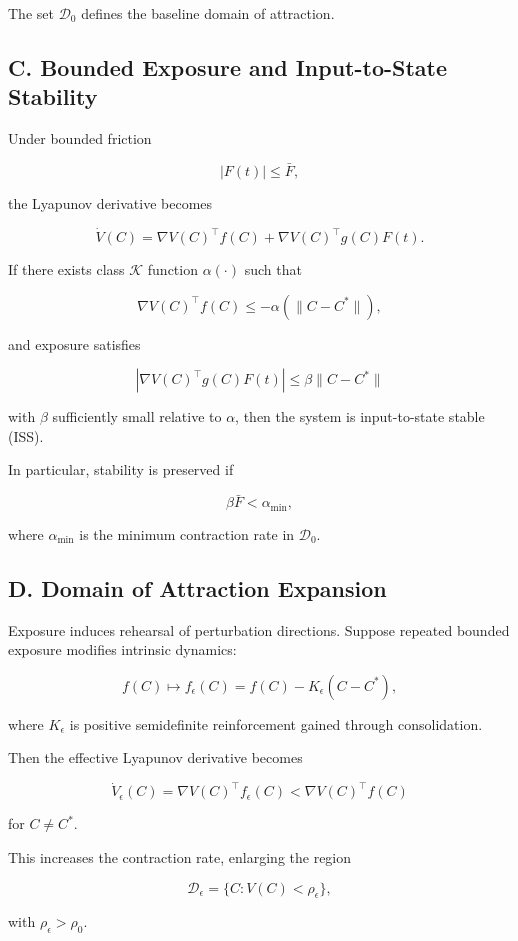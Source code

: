 \documentclass[11pt]{article}
\theoremstyle{remark}
\begin{document}
The set $\mathcal{D}_0$ defines the baseline domain of attraction.

\subsection*{C. Bounded Exposure and Input-to-State Stability}

Under bounded friction

\[
|F(t)| \le \bar{F},
\]

the Lyapunov derivative becomes

\[
\dot{V}(C)
=
\nabla V(C)^\top f(C)
+
\nabla V(C)^\top g(C) F(t).
\]

If there exists class $\mathcal{K}$ function $\alpha(\cdot)$ such that

\[
\nabla V(C)^\top f(C)
\le
- \alpha(\|C - C^*\|),
\]

and exposure satisfies

\[
|\nabla V(C)^\top g(C) F(t)|
\le
\beta \|C - C^*\|
\]

with $\beta$ sufficiently small relative to $\alpha$, then the system is input-to-state stable (ISS).

In particular, stability is preserved if

\[
\beta \bar{F} < \alpha_{\min},
\]

where $\alpha_{\min}$ is the minimum contraction rate in $\mathcal{D}_0$.

\subsection*{D. Domain of Attraction Expansion}

Exposure induces rehearsal of perturbation directions. Suppose repeated bounded exposure modifies intrinsic dynamics:

\[
f(C) \mapsto f_\epsilon(C)
=
f(C)
-
K_\epsilon(C - C^*),
\]

where $K_\epsilon$ is positive semidefinite reinforcement gained through consolidation.

Then the effective Lyapunov derivative becomes

\[
\dot{V}_\epsilon(C)
=
\nabla V(C)^\top f_\epsilon(C)
<
\nabla V(C)^\top f(C)
\]

for $C \neq C^*$.

This increases the contraction rate, enlarging the region

\[
\mathcal{D}_\epsilon
=
\{ C : V(C) < \rho_\epsilon \},
\]

with $\rho_\epsilon > \rho_0$.
\end{document}
